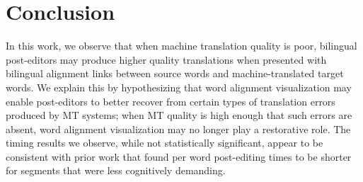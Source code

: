 \vspace{-1.5mm}
\section{Conclusion}

\vspace{-1.5mm}
%
%
%

In this work, we observe that when machine translation quality is poor, bilingual post-editors may produce higher quality translations when presented with bilingual alignment links between source words and machine-translated target words.
%
%
We explain this by hypothesizing that word alignment visualization may enable post-editors to better recover from certain types of translation errors produced by MT systems; when MT quality is high enough that such errors are absent, word alignment visualization may no longer play a restorative role.
%
The timing results we observe, while not statistically significant, appear to be consistent with prior work that found per word post-editing times to be shorter for segments that were less cognitively demanding.



%
%
